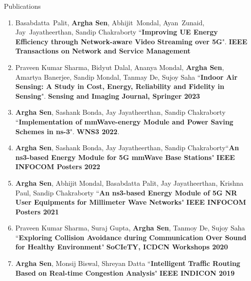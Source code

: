 \documentclass{resume} %
\begin{document}
\begin{rSection}{Publications}
\begin{enumerate}
			\item Basabdatta~Palit, \textbf{Argha Sen}, Abhijit~Mondal, Ayan~Zunaid, Jay~Jayatheerthan, Sandip Chakraborty ``\textbf{Improving UE Energy Efficiency through Network-aware Video Streaming over 5G}". \textbf{IEEE Transactions on Network and Service Management}
			\item Praveen Kumar Sharma, Bidyut Dalal, Ananya Mondal, \textbf{Argha Sen}, Amartya Banerjee, Sandip Mondal, Tanmay De, Sujoy Saha ``\textbf{Indoor Air Sensing: A Study in Cost, Energy, Reliability and Fidelity in Sensing}". \textbf{Sensing and Imaging Journal, Springer 2023}
			\item \textbf{Argha Sen}, Sashank Bonda, Jay Jayatheerthan, Sandip Chakraborty ``\textbf{Implementation of mmWave-energy Module and Power Saving Schemes in ns-3}". \textbf{WNS3 2022}.
			\item \textbf{Argha Sen}, Sashank Bonda, Jay Jayatheerthan, Sandip Chakraborty``\textbf{An ns3-based Energy Module for 5G mmWave Base Stations}" \textbf{IEEE INFOCOM Posters 2022}
			\item \textbf{Argha Sen}, Abhijit Mondal, Basabdatta Palit, Jay Jayatheerthan, Krishna Paul, Sandip Chakraborty ``\textbf{An ns3-based Energy Module of 5G NR User Equipments for Millimeter Wave Networks}" \textbf{IEEE INFOCOM Posters 2021}
			\item Praveen Kumar Sharma, Suraj Gupta, \textbf{Argha Sen}, Tanmoy De, Sujoy Saha ``\textbf{Exploring Collision Avoidance during Communication Over Sound for Healthy Environment}" \textbf{SoCIeTY, ICDCN Workshops 2020}
			\item \textbf{Argha Sen}, Monsij Biswal, Shreyan Datta ``\textbf{Intelligent Traffic Routing Based on Real-time Congestion Analysis}" \textbf{IEEE INDICON 2019}
			
		\end{enumerate}
	\end{rSection}
	
\end{document}
